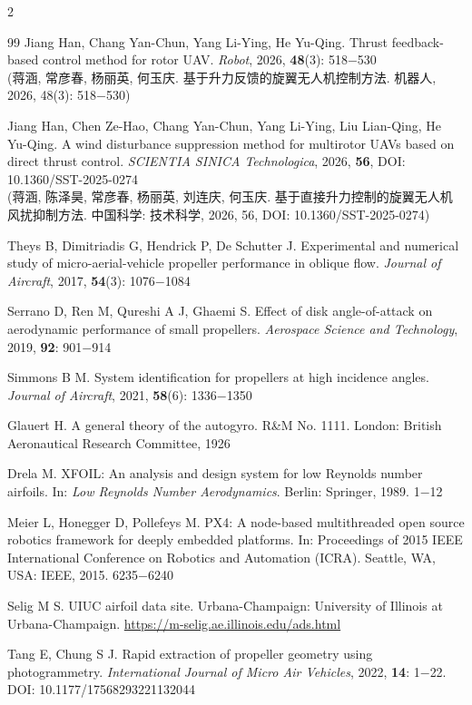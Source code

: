 \documentclass{aas}
\begin{document}
\begin{multicols}{2}
\begin{thebibliography}{99}
 Jiang Han, Chang Yan-Chun, Yang Li-Ying, He Yu-Qing. Thrust feedback-based control method for rotor UAV. {\sl Robot}, 2026, {\bf 48}(3): 518$-$530 \\
(蒋涵, 常彦春, 杨丽英, 何玉庆. 基于升力反馈的旋翼无人机控制方法. 机器人, 2026, 48(3): 518$-$530)

 Jiang Han, Chen Ze-Hao, Chang Yan-Chun, Yang Li-Ying, Liu Lian-Qing, He Yu-Qing. A wind disturbance suppression method for multirotor UAVs based on direct thrust control. {\sl SCIENTIA SINICA Technologica}, 2026, {\bf 56}, DOI: 10.1360/SST-2025-0274 \\
(蒋涵, 陈泽昊, 常彦春, 杨丽英, 刘连庆, 何玉庆. 基于直接升力控制的旋翼无人机风扰抑制方法. 中国科学: 技术科学, 2026, 56, DOI: 10.1360/SST-2025-0274)

 Theys B, Dimitriadis G, Hendrick P, De Schutter J. Experimental and numerical study of micro-aerial-vehicle propeller performance in oblique flow. {\sl Journal of Aircraft}, 2017, {\bf 54}(3): 1076$-$1084

 Serrano D, Ren M, Qureshi A J, Ghaemi S. Effect of disk angle-of-attack on aerodynamic performance of small propellers. {\sl Aerospace Science and Technology}, 2019, {\bf 92}: 901$-$914

 Simmons B M. System identification for propellers at high incidence angles. {\sl Journal of Aircraft}, 2021, {\bf 58}(6): 1336$-$1350

 Glauert H. A general theory of the autogyro. R\&M No. 1111. London: British Aeronautical Research Committee, 1926

 Drela M. XFOIL: An analysis and design system for low Reynolds number airfoils. In: {\sl Low Reynolds Number Aerodynamics}. Berlin: Springer, 1989. 1$-$12

 Meier L, Honegger D, Pollefeys M. PX4: A node-based multithreaded open source robotics framework for deeply embedded platforms. In: Proceedings of 2015 IEEE International Conference on Robotics and Automation (ICRA). Seattle, WA, USA: IEEE, 2015. 6235$-$6240

 Selig M S. UIUC airfoil data site. Urbana-Champaign: University of Illinois at Urbana-Champaign. \url{https://m-selig.ae.illinois.edu/ads.html}

 Tang E, Chung S J. Rapid extraction of propeller geometry using photogrammetry. {\sl International Journal of Micro Air Vehicles}, 2022, {\bf 14}: 1$-$22. DOI: 10.1177/17568293221132044


\end{thebibliography}
\end{multicols}
\end{document}

